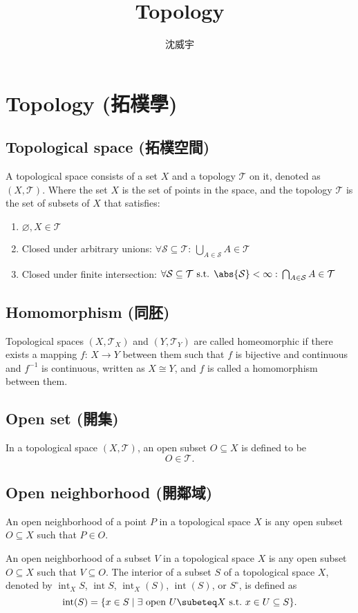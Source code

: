 \documentclass[a4paper,12pt]{article}
\begin{document}
\title{Topology}
\author{沈威宇}
\date{\temtoday}
\titletocdoc
\section{Topology (拓樸學)}
\subsection{Topological space (拓樸空間)}
A topological space consists of a set $X$ and a topology $\mathcal{T}$ on it, denoted as \( (X, \mathcal{T}) \). Where the set \( X \) is the set of points in the space, and the topology \( \mathcal{T} \) is the set of subsets of \( X \) that satisfies:
\begin{enumerate}
\item \(\varnothing,X\in\mathcal{T} \)
\item Closed under arbitrary unions: \(\forall\mathcal{S}\subseteq\mathcal{T}:\,\bigcup_{A\in\mathcal{S}}A\in\mathcal{T}\)
\item Closed under finite intersection: \(\forall\mathcal{S}\subseteq\mathcal{T}\text{ s.t. }\abs{\mathcal{S}}<\infty:\,\bigcap_{A\in\mathcal{S}}A\in\mathcal{T}\)
\end{enumerate}
\subsection{Homomorphism (同胚)}
Topological spaces $(X,\mathcal{T}_X)$ and $(Y,\mathcal{T}_Y)$ are called homeomorphic if there exists a mapping $f:\,X\to Y$ between them such that $f$ is bijective and continuous and $f^{-1}$ is continuous, written as \( X \cong Y \), and $f$ is called a homomorphism between them.
\subsection{Open set (開集)}
In a topological space \( (X, \mathcal{T}) \), an open subset \( O \subseteq X \) is defined to be
\[O\in \mathcal{T}.\]
\subsection{Open neighborhood (開鄰域)}
An open neighborhood of a point $P$ in a topological space $X$ is any open subset $O\subseteq X$ such that $P\in O$.

An open neighborhood of a subset $V$ in a topological space $X$ is any open subset $O\subseteq X$ such that $V\subseteq O$.
The interior of a subset $S$ of a topological space $X$, denoted by $\operatorname{int}_XS$, $\operatorname{int}S$, $\operatorname{int}_X(S)$, $\operatorname{int}(S)$, or $S^{\circ}$, is defined as
\[\operatorname{int}(S) = \{ x \in S \mid \exists \text{\ open\ } U\subeteq X \text{\ s.t.\ } x \in U \subseteq S \}.\]
\end{document}
